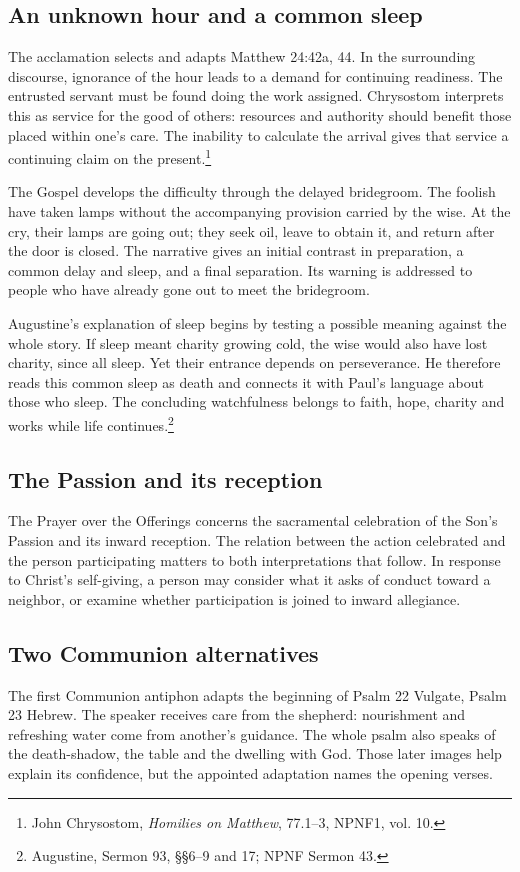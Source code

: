 \subsection{An unknown hour and a common sleep}
The acclamation selects and adapts Matthew 24:42a, 44. In the surrounding discourse, ignorance of the hour leads to a demand for continuing readiness. The entrusted servant must be found doing the work assigned. Chrysostom interprets this as service for the good of others: resources and authority should benefit those placed within one's care. The inability to calculate the arrival gives that service a continuing claim on the present.\footnote{John Chrysostom, \textit{Homilies on Matthew}, 77.1--3, NPNF1, vol. 10.}

The Gospel develops the difficulty through the delayed bridegroom. The foolish have taken lamps without the accompanying provision carried by the wise. At the cry, their lamps are going out; they seek oil, leave to obtain it, and return after the door is closed. The narrative gives an initial contrast in preparation, a common delay and sleep, and a final separation. Its warning is addressed to people who have already gone out to meet the bridegroom.

Augustine's explanation of sleep begins by testing a possible meaning against the whole story. If sleep meant charity growing cold, the wise would also have lost charity, since all sleep. Yet their entrance depends on perseverance. He therefore reads this common sleep as death and connects it with Paul's language about those who sleep. The concluding watchfulness belongs to faith, hope, charity and works while life continues.\footnote{Augustine, Sermon 93, §§6--9 and 17; NPNF Sermon 43.}

\subsection{The Passion and its reception}
The Prayer over the Offerings concerns the sacramental celebration of the Son's Passion and its inward reception. The relation between the action celebrated and the person participating matters to both interpretations that follow. In response to Christ's self-giving, a person may consider what it asks of conduct toward a neighbor, or examine whether participation is joined to inward allegiance.

\subsection{Two Communion alternatives}
The first Communion antiphon adapts the beginning of Psalm 22 Vulgate, Psalm 23 Hebrew. The speaker receives care from the shepherd: nourishment and refreshing water come from another's guidance. The whole psalm also speaks of the death-shadow, the table and the dwelling with God. Those later images help explain its confidence, but the appointed adaptation names the opening verses.

